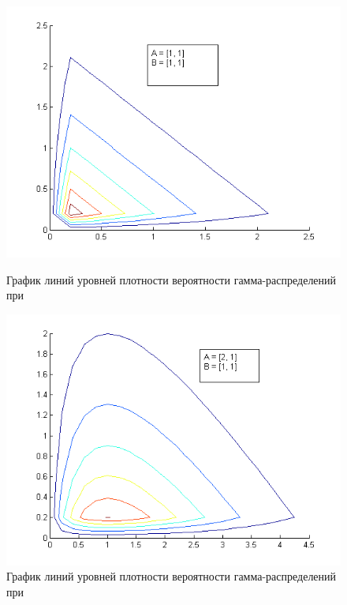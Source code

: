 \begin{figure}[h]
  \begin{minipage}[h]{0.49\linewidth}
    \includegraphics[width=1\linewidth]{../pic/gamma_contour_1}
    \caption{График линий уровней плотности вероятности гамма-распределений при}
    \label{pic:gamma_contour_start}
  \end{minipage}
  \hfill
  \begin{minipage}[h]{0.49\linewidth}
    \vspace{4mm}
    \includegraphics[width=1\linewidth]{../pic/gamma_contour_2}
    \caption{График линий уровней плотности вероятности гамма-распределений при}
  \end{minipage}
\end{figure}


